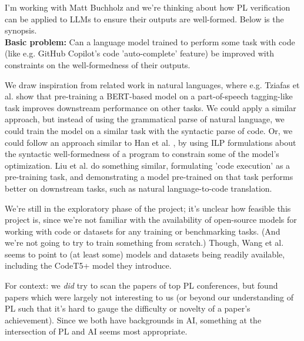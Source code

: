 \documentclass[11pt]{exam}
\begin{document}
\begin{questions}
    \question I'm working with Matt Buchholz and we're thinking about how PL verification can be applied to LLMs to ensure their outputs are well-formed. Below is the synopsis. \\

    \textbf{Basic problem:} Can a language model trained to perform some task with code (like e.g. GitHub Copilot's code 'auto-complete' feature) be improved with constraints on the well-formedness of their outputs.
    
    We draw inspiration from related work in natural languages, where e.g. Tziafas et al.  \cite{Tziafas} show that pre-training a BERT-based model on a part-of-speech tagging-like task improves downstream performance on other tasks. We could apply a similar approach, but instead of using the grammatical parse of natural language, we could train the model on a similar task with the syntactic parse of code. Or, we could follow an approach similar to Han et al. \cite{han-etal-2019-joint}, by using ILP formulations about the syntactic well-formedness of a program to constrain some of the model's optimization.
    Liu et al. \cite{liu2023code} do something similar, formulating 'code execution' as a pre-training task, and demonstrating a model pre-trained on that task performs better on downstream tasks, such as natural language-to-code translation.
    
    We're still in the exploratory phase of the project; it's unclear how feasible this project is, since we're not familiar with the availability of open-source models for working with code or datasets for any training or benchmarking tasks. (And we're not going to try to train something from scratch.) Though, Wang et al. \cite{wang2023codet5} seems to point to (at least some) models and datasets being readily available, including the CodeT5+ model they introduce.
    
    
    For context: we \emph{did} try to scan the papers of top PL conferences, but found papers which were largely not interesting to us (or beyond our understanding of PL such that it's hard to gauge the difficulty or novelty of a paper's achievement). Since we both have backgrounds in AI, something at the intersection of PL and AI seems most appropriate.

    
    
\end{questions}

\clearpage
\appendix
\end{document}
